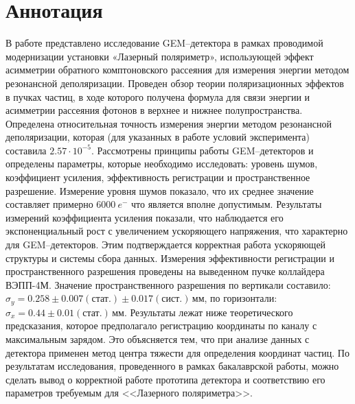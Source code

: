 \section*{Аннотация}
В работе представлено исследование GEM--детектора в рамках проводимой модернизации установки «Лазерный поляриметр», использующей эффект асимметрии обратного комптоновского рассеяния для измерения энергии методом резонансной деполяризации. Проведен обзор теории поляризационных эффектов в пучках частиц, в ходе которого получена формула для связи энергии и асимметрии рассеяния фотонов в верхнее и нижнее полупространства. Определена относительная точность измерения энергии методом резонансной деполяризации, которая (для указанных в работе условий эксперимента) составила $2.57\cdot10^{-5}$. Рассмотрены принципы работы GEM--детекторов и определены параметры, которые необходимо исследовать: уровень шумов, коэффициент усиления, эффективность регистрации и пространственное разрешение. Измерение уровня шумов показало, что их среднее значение составляет примерно $6000~e^-$ что является вполне допустимым. Результаты измерений коэффициента усиления показали, что наблюдается его экспоненциальный рост с увеличением ускоряющего напряжения, что характерно для GEM--детекторов. Этим подтверждается корректная работа ускоряющей структуры и системы сбора данных. Измерения эффективности регистрации и пространственного разрешения проведены на выведенном пучке коллайдера ВЭПП-4М. Значение пространственного разрешения по вертикали составило: $\sigma_y = 0.258\pm0.007(\text{стат.})\pm0.017(\text{сист.})$\,мм, по горизонтали: $\sigma_x = 0.44\pm0.01(\text{стат.})$\,мм. Результаты лежат ниже теоретического предсказания, которое предполагало регистрацию координаты по каналу с максимальным зарядом. Это объясняется тем, что при анализе данных с детектора применен метод центра тяжести для определения координат частиц. 
По результатам исследования, проведенного в рамках бакалаврской работы, можно сделать вывод о корректной работе прототипа детектора и соответствию его параметров требуемым для <<Лазерного поляриметра>>.